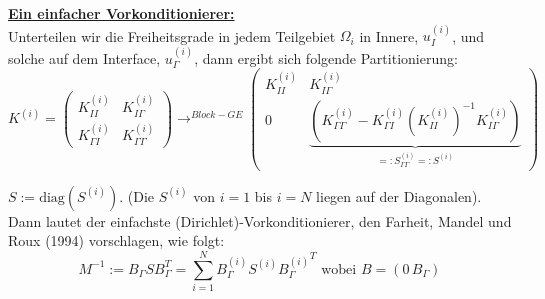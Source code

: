 \underline{\textbf{Ein einfacher Vorkonditionierer:}}\\
Unterteilen wir die Freiheitsgrade in jedem Teilgebiet $\Omega_i$ in Innere, $u^{(i)}_I$, und solche auf dem Interface, $u^{(i)}_\Gamma$, dann ergibt sich folgende Partitionierung:
\[K^{(i)}=
  \begin{pmatrix} 
    K^{(i)}_{II} & K^{(i)}_{I\Gamma} \\
    K^{(i)}_{\Gamma I} & K^{(i)}_{\Gamma \Gamma} 
  \end{pmatrix} 

 \longrightarrow^{Block-GE} 
 \begin{pmatrix} 
   K^{(i)}_{II} & K^{(i)}_{I\Gamma} \\
   0 & \underbrace{(K^{(i)}_{\Gamma \Gamma}-K^{(i)}_{\Gamma I} (K^{(i)}_{II})^{-1} K^{(i)}_{I \Gamma })}_{=: S^{(i)}_{\Gamma \Gamma}=: S^{(i)}}
\end{pmatrix} 

\]
\begin{definition}
  $S:= \text{diag} (S^{(i)}) $. (Die $S^{(i)}$ von $i=1$ bis $i=N$ liegen auf der Diagonalen). Dann lautet der einfachste (Dirichlet)-Vorkonditionierer, den Farheit, Mandel und Roux (1994) vorschlagen, wie folgt:
  \[M^{-1} := B_\Gamma S B^T_\Gamma = \sum_{i=1}^N B^{(i)}_\Gamma S^{(i)} {B^{(i)}_\Gamma}^T \text{ wobei } B=(0 \, B_\Gamma ) \]
\end{definition}

